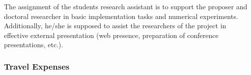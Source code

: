 \documentclass[enabledeprecatedfontcommands,cleardoublepage=empty,headsepline,twoside,11pt,DIV=15,BCOR=12mm,final]{scrartcl}
\begin{document}
The assignment of the students research assistant is to support the proposer and 
doctoral researcher in basic implementation tasks and numerical experiments. 
Additionally, he/she is supposed to assist the researchers of the project in effective
external presentation (web presence, preparation of conference presentations, etc.).



\subsubsection{Travel Expenses}
\end{document}
